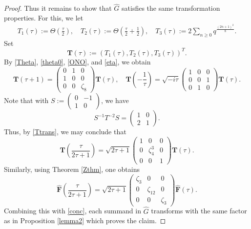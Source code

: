 \documentclass[12pt,reqno]{amsart}
\renewcommand{\t}{\tau}
\newcommand{\z}{\zeta}
\renewcommand{\(}{\left\(}
\renewcommand{\)}{\right\)}
\numberwithin{equation}{section}
\theoremstyle{plain}
\theoremstyle{definition}
\numberwithin{equation}{section}
\begin{document}
\begin{proof}
Thus it remains to show that $\widehat{G}$ satisfies the same transformation properties. For this, we let
\begin{align*}
T_1(\t):=\Theta\left(\frac{\t}{2}\right),\quad T_2(\t):=\Theta\left(\frac{\t}{2}+\frac 12\right),\quad T_3(\t):=%
2\sum_{n\ge 0}q^{\frac{(2n+1)^2}8}.
\end{align*}
Set
\[
\bm{T}(\t):=\left(T_1(\t), T_2(\t), T_3(\t)\right)^T.
\]
By \eqref{Theta}, \eqref{theta0}, \eqref{ONO}, and \eqref{eta}, we obtain
\begin{equation}\label{Ttrans}
\bm{T}(\t+1)=\begin{pmatrix}
0&1&0\\
1&0&0\\
0&0&\z_8 
\end{pmatrix}\bm{T}(\t), \quad \bm{T}\left(-\frac{1}{\t}\right)=\sqrt{-i\t}\begin{pmatrix}
1&0&0\\
0&0&1\\
0&1&0 
\end{pmatrix}\bm{T}(\t).
\end{equation}
Note that with $S:=(\begin{smallmatrix}
0&-1\\1&0
\end{smallmatrix})$, we have 
\[
S^{-1}T^{-2}S=\begin{pmatrix}
1&0\\
2&1
\end{pmatrix}.
\] Thus, by \eqref{Ttrans}, we may conclude that 
\begin{equation}\label{conc}
\bm{T}\left(\frac{\t}{2\t+1}\right)=\sqrt{2\t+1}\begin{pmatrix}
1&0&0\\
0&\z^{3}_4&0\\
0&0&1
\end{pmatrix}\bm{T}\left(\t\right).
\end{equation}
Similarly, using Theorem \ref{Zthm}, one obtains 
\[
\widehat{\bm{F}}\left(\frac{\t}{2\t+1}\right)=\sqrt{2\t+1}\begin{pmatrix}
\z_{3}&0 &0\\
0 &\z_{12} & 0\\
0&0&\z_3
\end{pmatrix}\widehat{\bm{F}}(\t).
\]
Combining this with \eqref{conc}, each summand in $\widehat{G}$ transforms with the same factor as in Proposition \ref{lemma2} which proves the claim.\qedhere 
\end{proof}
\end{document}
